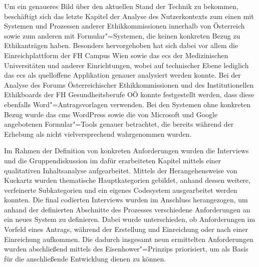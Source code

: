\documentclass[a4paper,12pt,twoside,numbers=noendperiod]{scrreprt}
\begin{document}
\medskip

Um ein genaueres Bild über den aktuellen Stand der Technik zu bekommen, beschäftigt sich das letzte Kapitel der Analyse des Nutzerkontexts zum einen mit Systemen und Prozessen anderer Ethikkommissionen innerhalb von Österreich sowie zum anderen mit Formular"=Systemen, die keinen konkreten Bezug zu Ethikanträgen haben. Besonders hervorgehoben hat sich dabei vor allem die Einreichplattform der FH Campus Wien sowie das \acl{ecs} der Medizinischen Universitäten und anderer Einrichtungen, wobei auf technischer Ebene lediglich das \ac{ecs} als quelloffene Applikation genauer analysiert werden konnte. Bei der Analyse des Forums Österreichischer Ethikkommissionen und des Institutionellen Ethikboards der FH Gesundheitsberufe OÖ konnte festgestellt werden, dass diese ebenfalls Word"=Antragsvorlagen verwenden. Bei den Systemen ohne konkreten Bezug wurde das \acl{cms} WordPress sowie die von Microsoft und Google angebotenen Formular"=Tools genauer betrachtet, die bereits während der Erhebung als nicht vielversprechend wahrgenommen wurden.

\medskip

Im Rahmen der Definition von konkreten Anforderungen wurden die Interviews und die Gruppendiskussion im dafür erarbeiteten Kapitel mittels einer qualitativen Inhaltsanalyse aufgearbeitet. Mittels der Herangehensweise von Kuckartz wurden thematische Hauptkategorien gebildet, anhand dessen weitere, verfeinerte Subkategorien und ein eigenes Codesystem ausgearbeitet werden konnten. Die final codierten Interviews wurden im Anschluss herangezogen, um anhand der definierten Abschnitte des Prozesses verschiedene Anforderungen an ein neues System zu definieren. Dabei wurde unterschieden, ob Anforderungen im Vorfeld eines Antrags, während der Erstellung und Einreichung oder nach einer Einreichung aufkommen. Die dadurch insgesamt neun ermittelten Anforderungen wurden abschließend mittels des Eisenhower"=Prinzips priorisiert, um als Basis für die anschließende Entwicklung dienen zu können.

\medskip
\end{document}
